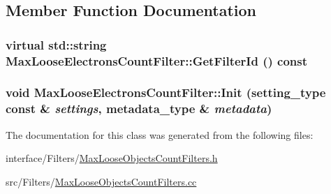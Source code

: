 \subsection{Member Function Documentation}
\hypertarget{classMaxLooseElectronsCountFilter_a1c3982b0f7faf50d8158da566825251f}{
\subsubsection[{GetFilterId}]{\setlength{\rightskip}{0pt plus 5cm}virtual std::string MaxLooseElectronsCountFilter::GetFilterId () const}}
\label{classMaxLooseElectronsCountFilter_a1c3982b0f7faf50d8158da566825251f}
\hypertarget{classMaxLooseElectronsCountFilter_ae0fd3396d0f69343224627fa33ce8595}{
\subsubsection[{Init}]{\setlength{\rightskip}{0pt plus 5cm}void MaxLooseElectronsCountFilter::Init (setting\_\-type const \& {\em settings}, \/  metadata\_\-type \& {\em metadata})}}
\label{classMaxLooseElectronsCountFilter_ae0fd3396d0f69343224627fa33ce8595}


The documentation for this class was generated from the following files:\begin{DoxyCompactItemize}
\item 
interface/Filters/\hyperlink{MaxLooseObjectsCountFilters_8h}{MaxLooseObjectsCountFilters.h}\item 
src/Filters/\hyperlink{MaxLooseObjectsCountFilters_8cc}{MaxLooseObjectsCountFilters.cc}\end{DoxyCompactItemize}
